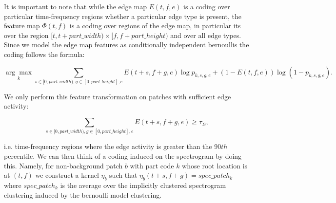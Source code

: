\documentclass[11pt]{article}
\begin{document}
It is important to note that while the edge map $E(t,f,e)$ is a coding over particular
time-frequency regions whether a particular edge type is present,
the feature map $\Phi(t,f)$ is a coding over regions of the edge map, in particular
its over the region $[t,t+part\_width) \times [f,f+part\_height)$ and over all edge
types.  Since we model the edge map features as conditionally independent bernoullis
the coding follows the formula:

$$ \underset{k}{\arg\max} \sum_{s\in[0,part\_width),g\in[0,part\_height],e} 
             E(t+s,f+g,e)\log p_{k,s,g,e} +(1 - E(t,f,e))\log (1-p_{k,s,g,e}).$$

We only perform this feature transformation on patches with sufficient edge activity:

$$ \sum_{s\in[0,part\_width),g\in[0,part\_height],e} 
             E(t+s,f+g,e) \geq \tau_{.9},$$

i.e. time-frequency regions where the edge activity is greater than
the 90$th$ percentile.  We can then think of a coding induced on the
spectrogram by doing this.  Namely, for non-background patch $b$ with
part code $k$ whose root location is at $(t,f)$ we construct a kernel
$\eta_b$ such that $\eta_b(t+s,f+g) = spec\_patch_k$ where
$spec\_patch_k$ is the average over the implicitly clustered
spectrogram clustering induced by the bernoulli model clustering.
\end{document}
